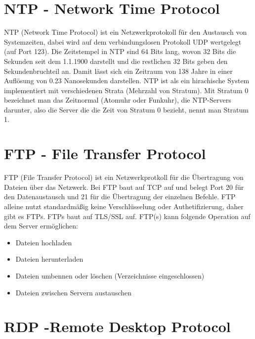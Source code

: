 \documentclass[a4paper]{article}
\begin{document}
\section{NTP - Network Time Protocol}

NTP (Network Time Protocol) ist ein Netzwerkprotokoll für den Austausch von Systemzeiten, dabei wird auf dem verbindungslosen Protokoll UDP wertgelegt (auf Port 123). Die Zeitstempel in NTP sind 64 Bits lang, wovon 32 Bits die Sekunden seit dem 1.1.1900 darstellt und die restlichen 32 Bits geben den Sekundenbruchteil an. Damit lässt sich ein Zeitraum von 138 Jahre in einer Auflösung von 0.23 Nanosekunden darstellen. NTP ist als ein hirachische System implementiert mit verschiedenen Strata (Mehrzahl von Stratum). Mit Stratum 0 bezeichnet man das Zeitnormal (Atomuhr oder Funkuhr), die NTP-Servers darunter, also die Server die die Zeit von Stratum 0 bezieht, nennt man Stratum 1.

\newpage
\section{FTP - File Transfer Protocol}

FTP (File Transfer Protocol) ist ein Netzwerkprotkoll für die Übertragung von Dateien über das Netzwerk. Bei FTP baut auf TCP auf und belegt Port 20 für den Datenaustausch und 21 für die Übertragung der einzelnen Befehle. FTP alleine nutzt standardmäßig keine Verschlüsselung oder Authetifizierung, daher gibt es FTPs. FTPs baut auf TLS/SSL auf. FTP(s) kann folgende Operation auf dem Server ermöglichen:

\begin{itemize}
\item Dateien hochladen
\item Dateien herunterladen
\item Dateien umbennen oder löschen (Verzeichnisse eingeschlossen)
\item Dateien zwischen Servern austauschen
\end{itemize}

\newpage
\section{RDP -Remote Desktop Protocol}
\end{document}
